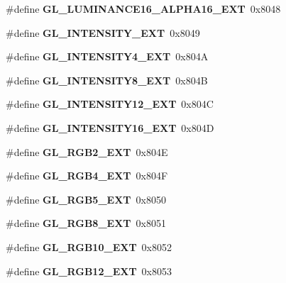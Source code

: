 \begin{DoxyCompactItemize}
\item 
\#define {\bfseries G\+L\+\_\+\+L\+U\+M\+I\+N\+A\+N\+C\+E16\+\_\+\+A\+L\+P\+H\+A16\+\_\+\+E\+X\+T}~0x8048\label{_s_d_l__opengl_8h_a1e418ba0cabe421c3def1cfae9148c69}

\item 
\#define {\bfseries G\+L\+\_\+\+I\+N\+T\+E\+N\+S\+I\+T\+Y\+\_\+\+E\+X\+T}~0x8049\label{_s_d_l__opengl_8h_a98a8c54a5e7c1c800f89c066f93da46d}

\item 
\#define {\bfseries G\+L\+\_\+\+I\+N\+T\+E\+N\+S\+I\+T\+Y4\+\_\+\+E\+X\+T}~0x804\+A\label{_s_d_l__opengl_8h_a5407a22ab99b1b24203252e4a9303e20}

\item 
\#define {\bfseries G\+L\+\_\+\+I\+N\+T\+E\+N\+S\+I\+T\+Y8\+\_\+\+E\+X\+T}~0x804\+B\label{_s_d_l__opengl_8h_aedaa6d09c50b8512d334eeba0e93f78d}

\item 
\#define {\bfseries G\+L\+\_\+\+I\+N\+T\+E\+N\+S\+I\+T\+Y12\+\_\+\+E\+X\+T}~0x804\+C\label{_s_d_l__opengl_8h_aa8c68030256380465cff554bc68e630a}

\item 
\#define {\bfseries G\+L\+\_\+\+I\+N\+T\+E\+N\+S\+I\+T\+Y16\+\_\+\+E\+X\+T}~0x804\+D\label{_s_d_l__opengl_8h_aead9e0d7fda38540fc52ab6da157d4e7}

\item 
\#define {\bfseries G\+L\+\_\+\+R\+G\+B2\+\_\+\+E\+X\+T}~0x804\+E\label{_s_d_l__opengl_8h_ae91828b5b76cd9453b63730eac82b4c0}

\item 
\#define {\bfseries G\+L\+\_\+\+R\+G\+B4\+\_\+\+E\+X\+T}~0x804\+F\label{_s_d_l__opengl_8h_abea3961b785b16051ae1159ee7899cd2}

\item 
\#define {\bfseries G\+L\+\_\+\+R\+G\+B5\+\_\+\+E\+X\+T}~0x8050\label{_s_d_l__opengl_8h_a6ad65592b54dfc79c24b6dd9ca27eaaf}

\item 
\#define {\bfseries G\+L\+\_\+\+R\+G\+B8\+\_\+\+E\+X\+T}~0x8051\label{_s_d_l__opengl_8h_aaabcecc3dfe39952ddb4f2e49dbc0aaa}

\item 
\#define {\bfseries G\+L\+\_\+\+R\+G\+B10\+\_\+\+E\+X\+T}~0x8052\label{_s_d_l__opengl_8h_a412a965b9f8f7aa4c6b8379785729a3a}

\item 
\#define {\bfseries G\+L\+\_\+\+R\+G\+B12\+\_\+\+E\+X\+T}~0x8053\label{_s_d_l__opengl_8h_af8c259c8b5a8437953f9a81fbbc0f9af}


\end{DoxyCompactItemize}
